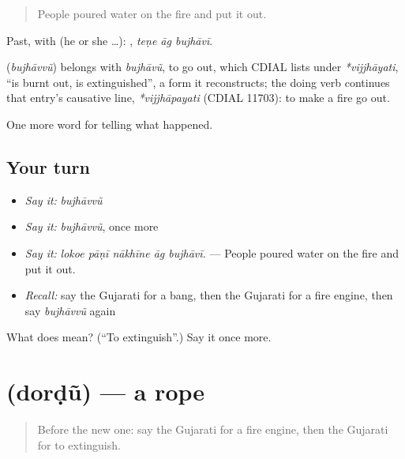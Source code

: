 \begin{quote}
People poured water on the fire and put it out.
\end{quote}

Past, with  (he or she …):   , \emph{teṇe āg bujhāvī}.

\begin{cousinweb}
\textbf{} (\emph{bujhāvvũ}) belongs with \emph{bujhāvũ}, to go out, which CDIAL lists under \emph{*vijjhāyati}, \textquotedblleft{}is burnt out, is extinguished\textquotedblright{}, a form it reconstructs; the doing verb continues that entry's causative line, \emph{*vijjhāpayati} (CDIAL 11703): to make a fire go out.
\end{cousinweb}

\begin{grammarlens}[title={What you've built}]
One more word for telling what happened.
\end{grammarlens}

\subsection*{Your turn}
\begin{itemize}
\raggedright
  \item \emph{Say it:} \emph{bujhāvvũ}
  \item \emph{Say it:} \emph{bujhāvvũ}, once more
  \item \emph{Say it:} \emph{lokoe pāṇī nākhīne āg bujhāvī.} — People poured water on the fire and put it out.
  \item \emph{Recall:} say the Gujarati for a bang, then the Gujarati for a fire engine, then say \emph{bujhāvvũ} again
\end{itemize}

\begin{tcolorbox}[breakable,colback=teal!4,colframe=teal!35!black,title={Before you move on}]
What does  mean? (\textquotedblleft{}To extinguish\textquotedblright{}.) Say it once more.
\end{tcolorbox}
\section[\texorpdfstring{\gu{દોરડું} (dorḍũ)}{દોરડું (dorḍũ)}]{ (dorḍũ) — a rope}

\label{lesson:GU-C302-dordu}



\begin{quote}
Before the new one: say the Gujarati for a fire engine, then the Gujarati for to extinguish.
\end{quote}

